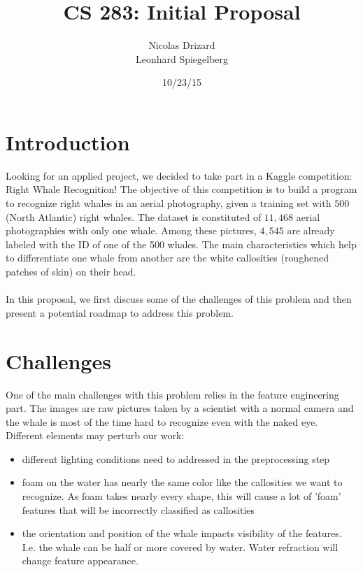 \documentclass[11pt,a4paper,oneside]{report}
\begin{document}
\title{CS 283: Initial Proposal}
\author{Nicolas Drizard \\
Leonhard Spiegelberg}
\date{10/23/15}

\maketitle

\newpage

\section*{Introduction}

Looking for an applied project, we decided to take part in a Kaggle competition: Right Whale Recognition! The objective of this competition is to build a program to recognize right whales in an aerial photography, given a training set with $500$ (North Atlantic) right whales. The dataset is constituted of $11,468$ aerial photographies with only one whale. Among these pictures, $4,545$ are already labeled with the ID of one of the 500 whales. The main characteristics which help to differentiate one whale from another are the white callosities (roughened patches of skin) on their head.\\
\\

In this proposal, we first discuss some of the challenges of this problem and then present a potential roadmap to address this problem.


\section*{Challenges}

One of the main challenges with this problem relies in the feature engineering part. The images are raw pictures taken by a scientist with a normal camera and the whale is most of the time hard to recognize even with the naked eye. Different elements may perturb our work:
\begin{itemize}
	\item different lighting conditions need to addressed in the preprocessing step
	\item foam on the water has nearly the same color like the callosities we want to recognize. As foam takes nearly every shape, this will cause a lot of 'foam' features that will be incorrectly classified as callosities
	\item the orientation and position of the whale impacts visibility of the features. I.e. the whale can be half or more covered by water. Water refraction will change feature appearance.
\end{itemize}
\end{document}
